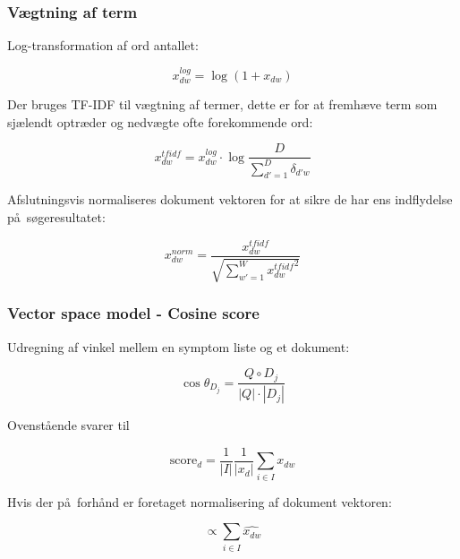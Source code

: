 \documentclass[xcolor=table]{beamer}
\begin{document}
\begin{frame}

  \frametitle{V\ae gtning af term}

  Log-transformation af ord antallet:

  \[
  x_{dw}^{log} = \log{(1 + x_{dw})}
  \]

  Der bruges TF-IDF til v\ae gtning af termer, dette er for at fremh\ae ve term som sj\ae lendt optr\ae der og nedv\ae gte ofte forekommende ord:

  \[
  x_{dw}^{tfidf} = x_{dw}^{log} \cdot \log{\frac{D}{\sum_{d\prime = 1}^{D}\delta_{d\prime w}}}
  \]

  Afslutningsvis normaliseres dokument vektoren for at sikre de har ens indflydelse p\aa\ s\o geresultatet:

  \[
  x_{dw}^{norm} = \frac{x_{dw}^{tfidf}}{\sqrt{\sum_{w\prime = 1}^{W} {x_{dw}^{tfidf}}^{2}}}
  \]

\end{frame}

\begin{frame}

  \frametitle{Vector space model - Cosine score}

  Udregning af vinkel mellem en symptom liste og et dokument:
  
  \[
  \cos \theta_{D_j} = \frac{Q \circ D_j}{|Q| \cdot |D_j|}
  \]
  
  Ovenst\aa ende svarer til
  
  \[
  \textrm{score}_{d} = \frac{1}{|I|}\frac{1}{|x_{d}|} \sum_{i \in I} x_{dw}
  \]
  
  Hvis der p\aa\ forh\aa nd er foretaget normalisering af dokument vektoren:
  
  \[
  \propto  \sum_{i \in I} \widehat{x_{dw}}
  \]
  
\end{frame}
\end{document}
